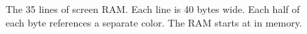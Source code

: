 \begin{figure}[H]
{\begin{adjustbox}{width=13.5cm}
  \end{adjustbox}

}\caption*{The 35 lines of screen RAM. Each line is 40 bytes wide. Each half of each byte references a separate color. The RAM starts at 
in memory.}
\end{figure}
